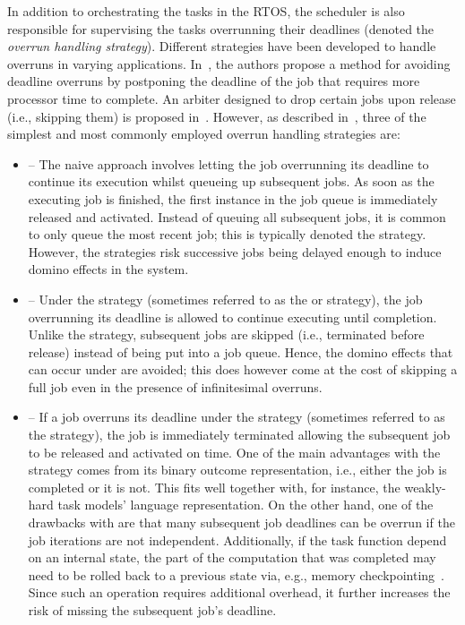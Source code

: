 In addition to orchestrating the tasks in the RTOS, the scheduler is also responsible for supervising the tasks overrunning their deadlines (denoted the \emph{overrun handling strategy}).
Different strategies have been developed to handle overruns in varying applications.
In~\cite{Caccamo:2002}, the authors propose a method for avoiding deadline overruns by postponing the deadline of the job that requires more processor time to complete.
An arbiter designed to drop certain jobs upon release (i.e., skipping them) is proposed in~\cite{Yoshimoto:2011}.
However, as described in~\cite{Cervin:2004b}, three of the simplest and most commonly employed overrun handling strategies are:
%
\begin{itemize}
    \item \tQ{} -- The naive approach involves letting the job overrunning its deadline to continue its execution whilst queueing up subsequent jobs.
        As soon as the executing job is finished, the first instance in the job queue is immediately released and activated.
        Instead of queuing all subsequent jobs, it is common to only queue the most recent job; this is typically denoted the \tQ{} strategy.
        However, the \tQ{} strategies risk successive jobs being delayed enough to induce domino effects in the system.

    \item \tS{} -- Under the \tS{} strategy (sometimes referred to as the  or  strategy), the job overrunning its deadline is allowed to continue executing until completion.
        Unlike the \tQ{} strategy, subsequent jobs are skipped (i.e., terminated before release) instead of being put into a job queue.
        Hence, the domino effects that can occur under \tQ{} are avoided; this does however come at the cost of skipping a full job even in the presence of infinitesimal overruns.

    \item \tK{} -- If a job overruns its deadline under the \tK{} strategy (sometimes referred to as the  strategy), the job is immediately terminated allowing the subsequent job to be released and activated on time.
        One of the main advantages with the \tK{} strategy comes from its binary outcome representation, i.e., either the job is completed or it is not.
        This fits well together with, for instance, the weakly-hard task models' language representation.
        On the other hand, one of the drawbacks with \tK{} are that many subsequent job deadlines can be overrun if the job iterations are not independent.
        Additionally, if the task function depend on an internal state, the part of the computation that was completed may need to be rolled back to a previous state via, e.g., memory checkpointing~\cite{Vogt:2015}.
        Since such an operation requires additional overhead, it further increases the risk of missing the subsequent job's deadline.
\end{itemize}
